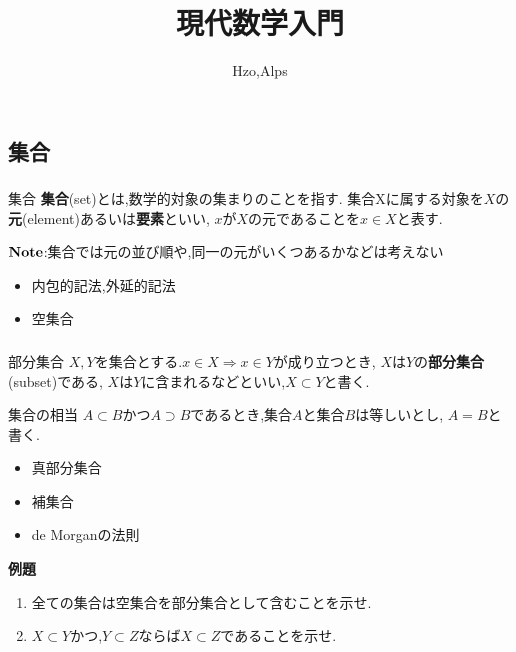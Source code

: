 \documentclass[dvipdfmx,b4j]{jsarticle}
\begin{document}
\title{現代数学入門}
\author{Hzo,Alps}

\maketitle
\tableofcontents


\section{}
\subsection{集合}
\subsubsection{}
\begin{definition}{集合}{}
\textbf{集合}(set)とは,数学的対象の集まりのことを指す.
集合Xに属する対象を$X$の\textbf{元}(element)あるいは\textbf{要素}といい,
$x$が$X$の元であることを$x\in X$と表す.
\end{definition}
\noindent $\bf{Note}$:集合では元の並び順や,同一の元がいくつあるかなどは考えない
\begin{itemize}
\item 内包的記法,外延的記法
\item 空集合
\end{itemize}

\subsubsection{}
\begin{definition}{部分集合}{}
$X,Y$を集合とする.$x\in X\Longrightarrow x\in Y$が成り立つとき,
$X$は$Y$の\textbf{部分集合}(subset)である,
$X$は$Y$に含まれるなどといい,$X\subset Y$と書く.
\end{definition}
\begin{definition}{集合の相当}{}
$A\subset B $かつ$A\supset B$であるとき,集合$A$と集合$B$は等しいとし,
$A = B $と書く.
\end{definition}
\begin{itemize}
    \item 真部分集合
    \item 補集合
    \item de Morganの法則
\end{itemize}
%
\begin{oframed}
\noindent\textbf{例題}
\begin{enumerate}
    \item 全ての集合は空集合を部分集合として含むことを示せ.
    \item $X\subset Y$かつ,$Y\subset Z$ならば$X\subset Z$であることを示せ.%
\end{enumerate}
\end{oframed}
\end{document}
